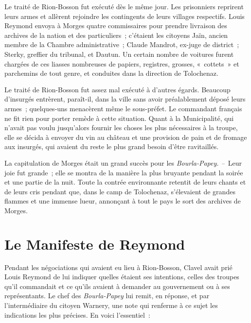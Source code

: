 \documentclass[french,twoside]{book} %
\begin{document}
Le traité de Rion-Bosson fut exécuté dès le même jour. Les prisonniers reprirent leurs armes et allèrent rejoindre les contingents de leurs villages respectifs. Louis Reymond envoya à Morges quatre commissaires pour prendre livraison des archives de la nation et des particuliers ; c’étaient les citoyens Jaïn, ancien membre de la Chambre administrative ; Claude Mandrot, ex-juge de district ; Sterky, greffier du tribunal, et Dautun. Un certain nombre de voitures furent chargées de ces liasses nombreuses de papiers, registres, grosses, « cottets » et parchemins de tout genre, et conduites dans la direction de Tolochenaz.\par
Le traité de Rion-Bosson fut assez mal exécuté à d’autres égards. Beaucoup d’insurgés entrèrent, paraît-il, dans la ville sans avoir préalablement déposé leurs armes ; quelques-uns menacèrent même le sous-préfet. Le commandant français ne fit rien pour porter remède à cette situation. Quant à la Municipalité, qui n’avait pas voulu jusqu’alors fournir les choses les plus nécessaires à la troupe, elle se décida à envoyer du vin au château et une provision de pain et de fromage aux insurgés, qui avaient du reste le plus grand besoin d’être ravitaillés.\par
La capitulation de Morges était un grand succès pour les \emph{Bourla-Papey. –} Leur joie fut grande ; elle se montra de la manière la plus bruyante pendant la soirée et une partie de la nuit. Toute la contrée environnante retentit de leurs chants et de leurs cris pendant que, dans le camp de Tolochenaz, s’élevaient de grandes flammes et une immense lueur, annonçant à tout le pays le sort des archives de Morges.
\section[{Le Manifeste de Reymond}]{Le Manifeste de Reymond}
\noindent Pendant les négociations qui avaient eu lieu à Rion-Bosson, Clavel avait prié Louis Reymond de lui indiquer quelles étaient ses intentions, celles des troupes qu’il commandait et ce qu’ils avaient à demander au gouvernement ou à ses représentants. Le chef des \emph{Bourla-Papey} lui remit, en réponse, et par l’intermédiaire du citoyen Warnery, une note qui renferme à ce sujet les indications les plus précises. En voici l’essentiel :\par
\end{document}
